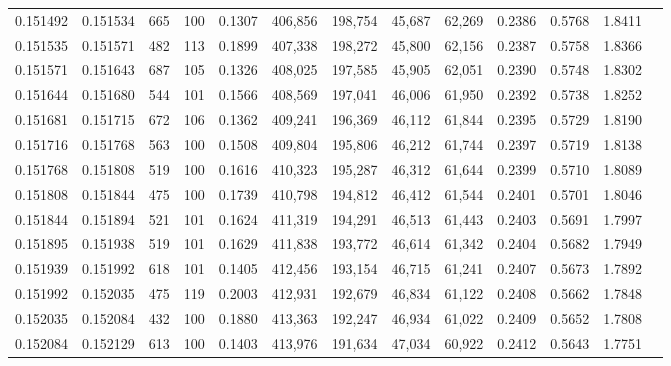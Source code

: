 \begin{tabular}{rrrrrrrrrrrrr}
0.151492 & 0.151534 &   665 & 100 &                                     0.1307 & 406,856 & 198,754 &  45,687 &  62,269 & 0.2386 & 0.5768 & 1.8411 \\
0.151535 & 0.151571 &   482 & 113 &                                     0.1899 & 407,338 & 198,272 &  45,800 &  62,156 & 0.2387 & 0.5758 & 1.8366 \\
0.151571 & 0.151643 &   687 & 105 &                                     0.1326 & 408,025 & 197,585 &  45,905 &  62,051 & 0.2390 & 0.5748 & 1.8302 \\
0.151644 & 0.151680 &   544 & 101 &                                     0.1566 & 408,569 & 197,041 &  46,006 &  61,950 & 0.2392 & 0.5738 & 1.8252 \\
0.151681 & 0.151715 &   672 & 106 &                                     0.1362 & 409,241 & 196,369 &  46,112 &  61,844 & 0.2395 & 0.5729 & 1.8190 \\
0.151716 & 0.151768 &   563 & 100 &                                     0.1508 & 409,804 & 195,806 &  46,212 &  61,744 & 0.2397 & 0.5719 & 1.8138 \\
0.151768 & 0.151808 &   519 & 100 &                                     0.1616 & 410,323 & 195,287 &  46,312 &  61,644 & 0.2399 & 0.5710 & 1.8089 \\
0.151808 & 0.151844 &   475 & 100 &                                     0.1739 & 410,798 & 194,812 &  46,412 &  61,544 & 0.2401 & 0.5701 & 1.8046 \\
0.151844 & 0.151894 &   521 & 101 &                                     0.1624 & 411,319 & 194,291 &  46,513 &  61,443 & 0.2403 & 0.5691 & 1.7997 \\
0.151895 & 0.151938 &   519 & 101 &                                     0.1629 & 411,838 & 193,772 &  46,614 &  61,342 & 0.2404 & 0.5682 & 1.7949 \\
0.151939 & 0.151992 &   618 & 101 &                                     0.1405 & 412,456 & 193,154 &  46,715 &  61,241 & 0.2407 & 0.5673 & 1.7892 \\
0.151992 & 0.152035 &   475 & 119 &                                     0.2003 & 412,931 & 192,679 &  46,834 &  61,122 & 0.2408 & 0.5662 & 1.7848 \\
0.152035 & 0.152084 &   432 & 100 &                                     0.1880 & 413,363 & 192,247 &  46,934 &  61,022 & 0.2409 & 0.5652 & 1.7808 \\
0.152084 & 0.152129 &   613 & 100 &                                     0.1403 & 413,976 & 191,634 &  47,034 &  60,922 & 0.2412 & 0.5643 & 1.7751 \\

\end{tabular}
